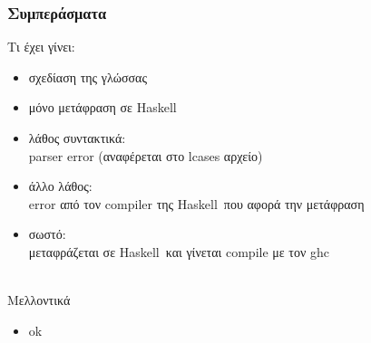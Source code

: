 \documentclass{beamer}
\def\e{\foreignlanguage{english}}
\def\h{\e{Haskell}}
\begin{document}
\begin{frame}

\frametitle{Συμπεράσματα}

Τι έχει γίνει:
\begin{itemize}
\item σχεδίαση της γλώσσας

\item μόνο μετάφραση σε \h

\item λάθος συντακτικά:
\\\e{parser error} (αναφέρεται στο \e{lcases} αρχείο)

\item άλλο λάθος:
\\\e{error} από τον \e{compiler} της \h\ που αφορά την μετάφραση

\item σωστό:
\\ μεταφράζεται σε \h\ και γίνεται \e{compile} με τον \e{ghc}
\\~\

\end{itemize}

Μελλοντικά
\begin{itemize}
\item ok
\\~\

\end{itemize}

\end{frame}
\end{document}

